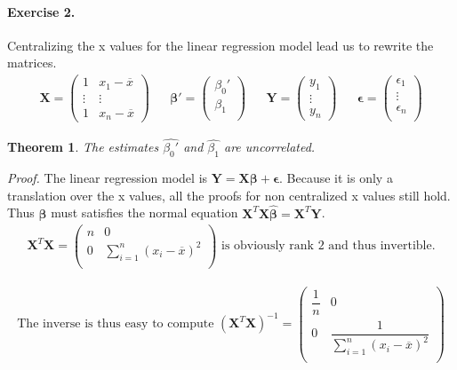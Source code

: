 \documentclass{article}
\newtheorem*{theo}{Theorem}
\begin{document}
\paragraph{Exercise 2.}

Centralizing the x values for the linear regression model lead us to rewrite the matrices.
\begin{align*}
\pmb{X}=
\begin{pmatrix}
1 & x_1-\overline{x} \\
\vdots & \vdots \\
1 & x_n-\overline{x}
\end{pmatrix}&&
\pmb{\beta '}=
\begin{pmatrix}
\beta_0' \\
\beta_1 \\
\end{pmatrix}&&
\pmb{Y}=
\begin{pmatrix}
y_1 \\
\vdots \\
y_n
\end{pmatrix}&&
\pmb{\epsilon}=
\begin{pmatrix}
\epsilon_1 \\
\vdots \\
\epsilon_n \\
\end{pmatrix}
\end{align*}

\begin{theo}
The estimates $\widehat{\beta_0 '}$ and $\widehat{\beta_1}$ are uncorrelated.
\end{theo}
\textit{Proof.} The linear regression model is $\pmb{Y=X\beta + \epsilon}$. Because it is only a translation over the x values, all the proofs for non centralized x values still hold. Thus $\widehat{\pmb{\beta}}$ must satisfies the normal equation $\pmb{X}^T \pmb{X \widehat{\beta}}=\pmb{X}^T \pmb{Y}$.\\

\begin{align*}
\pmb{X}^T \pmb{X}=
\begin{pmatrix}
n & 0 \\
0 & \sum_{i=1}^n (x_i-\overline{x})^2 \\
\end{pmatrix}
\text{ is obviously rank 2 and thus invertible.}
\end{align*}

\begin{align*}
\text{The inverse is thus easy to compute }
(\pmb{X}^T \pmb{X})^{-1}=
\begin{pmatrix}
\dfrac{1}{n} & 0 \\
0 & \dfrac{1}{\sum_{i=1}^n (x_i-\overline{x})^2} \\
\end{pmatrix}
\end{align*}
\end{document}
